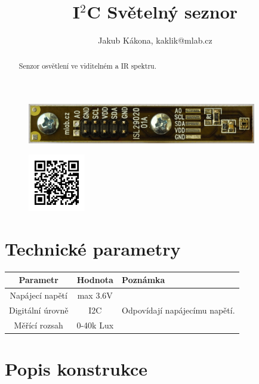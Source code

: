 \documentclass[12pt,a4paper,oneside]{article}
\begin{document}
\title{I$^2$C Světelný seznor }
\author{Jakub Kákona, kaklik@mlab.cz}
\maketitle

\thispagestyle{empty}
\begin{abstract}
Senzor osvětlení ve viditelném a IR spektru. 
\end{abstract}

\begin{figure} [htbp]
\begin{center}
\includegraphics [width=100mm] {./img/ISL2902001A_Top_Big.jpg} 
\end{center}
\end{figure}

\begin{figure} [b]
\includegraphics [width=25mm] {./img/ISL2902001A_QRcode.png} 
\end{figure}

\newpage
\tableofcontents

\section{Technické parametry}
\begin{table}[htbp]
\begin{center}
\begin{tabular}{|c|c|p{4.7cm}|}
\hline
Parametr & Hodnota & Poznámka \\
\hline
Napájecí napětí  & max 3.6V & \\ 
\hline
Digitální úrovně &  I2C &  Odpovídají napájecímu napětí. \\ 
\hline
Měřící rozsah &  0-40k Lux &   \\ 
\hline
\end{tabular}
\end{center}
\end{table}

\section{Popis konstrukce}
\end{document}
